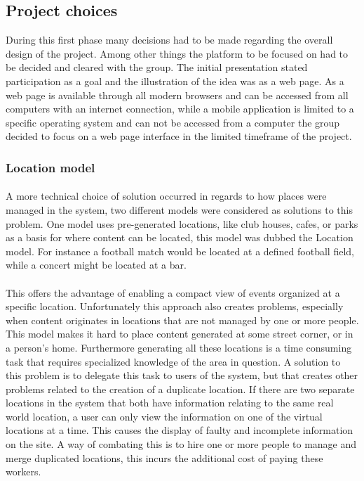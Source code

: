 \subsection{Project choices}
\label{subsec:PrelimWorkChoices}

During this first phase many decisions had to be made regarding the overall design of the project. Among other things the platform to be focused on had to be decided and cleared with the group. The initial presentation stated participation as a goal and the illustration of the idea was as a web page. As a web page is available through all modern browsers and can be accessed from all computers with an internet connection, while a mobile application is limited to a specific operating system and can not be accessed from a computer the group decided to focus on a web page interface in the limited timeframe of the project.


\subsubsection{Location model}
\paragraph{}A more technical choice of solution occurred in regards to how places were managed in the system, two different models were considered as solutions to this problem. One model uses pre-generated locations, like club houses, cafes, or parks as a basis for where content can be located, this model was dubbed the Location model. For instance a football match would be located at a defined football field, while a concert might be located at a bar.

\paragraph{} This offers the advantage of enabling a compact view of events organized at a specific location. Unfortunately this approach also creates problems, especially when content originates in locations that are not managed by one or more people. This model makes it hard to place content generated at some street corner, or in a person’s home. Furthermore generating all these locations is a time consuming task that requires specialized knowledge of the area in question. A solution to this problem is to delegate this task to users of the system, but that creates other problems related to the creation of a duplicate location. If there are two separate locations in the system that both have information relating to the same real world location, a user can only view the information on one of the virtual locations at a time. This causes the display of faulty and incomplete information on the site. A way of combating this is to hire one or more people to manage and merge duplicated locations, this incurs the additional cost of paying these workers.
        
